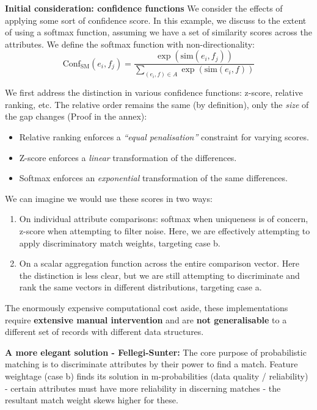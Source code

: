 \textbf{Initial consideration: confidence functions}
We consider the effects of applying some sort of confidence score. In this example, we discuss to the extent of using a softmax function, assuming we have a set of similarity scores across the attributes. We define the softmax function with non-directionality:
\[
\text{Conf}_{\text{SM}}(e_{i},f_{j})=\frac{\exp (\text{sim}(e_{i},f_{j}))}{\sum _{(e_{i},f)\in A}\exp (\text{sim}(e_{i},f))}
\]

We first address the distinction in various confidence functions: z-score, relative ranking, etc. The relative order remains the same (by definition), only the \textit{size} of the gap changes (Proof in the annex):
\begin{itemize}
  \item Relative ranking enforces a \textit{``equal penalisation''} constraint for varying scores.
  \item Z-score enforces a \textit{linear} transformation of the differences.
  \item Softmax enforces an \textit{exponential} transformation of the same differences.
\end{itemize}

We can imagine we would use these scores in two ways:
\begin{enumerate}
  \item On individual attribute comparisons: softmax when uniqueness is of concern, z-score when attempting to filter noise. Here, we are effectively attempting to apply discriminatory match weights, targeting case b.
  \item On a scalar aggregation function across the entire comparison vector. Here the distinction is less clear, but we are still attempting to discriminate and rank the same vectors in different distributions, targeting case a.
\end{enumerate}

The enormously expensive computational cost aside, these implementations require \textbf{extensive manual intervention} and are \textbf{not generalisable} to a different set of records with different data structures.

\textbf{A more elegant solution - Fellegi-Sunter:}
The core purpose of probabilistic matching is to discriminate attributes by their power to find a match. Feature weightage (case b) finds its solution in m-probabilities (data quality / reliability) - certain attributes must have more reliability in discerning matches - the resultant match weight skews higher for these.

